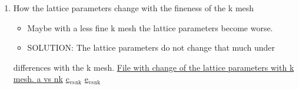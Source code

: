 \documentclass[11pt]{article}
\begin{document}
\begin{enumerate}
\item How the lattice parameters change with the fineness of the k mesh
\label{sec-1-2-1-1}
\begin{itemize}
\item Maybe with a less fine k mesh the lattice parameters become
worse.
\item SOLUTION: The lattice parameters do not change that much under
\end{itemize}
differences with the k mesh. \href{file:///home/tigany/Documents/disl_gsurf/hcp_pris_screw/hcp_relaxed_pris_screw/gamma_surfaces/get_hom_shear_bc_gs.py}{File with change of the lattice
parameters with k mesh. }
\href{file:///home/tigany/Documents/disl_gsurf/hcp_pris_screw/hcp_relaxed_pris_screw/gamma_surfaces/a_hcp_vs_nk.png}{a vs nk}
\href{file:///home/tigany/Documents/disl_gsurf/hcp_pris_screw/hcp_relaxed_pris_screw/gamma_surfaces/c_hcp_vs_nk.png}{c$_{\text{vs}}$$_{\text{nk}}$}
\href{file:///home/tigany/Documents/disl_gsurf/hcp_pris_screw/hcp_relaxed_pris_screw/gamma_surfaces/e_hcp_vs_nk.png}{e$_{\text{vs}}$$_{\text{nk}}$}


\end{enumerate}
\end{document}
